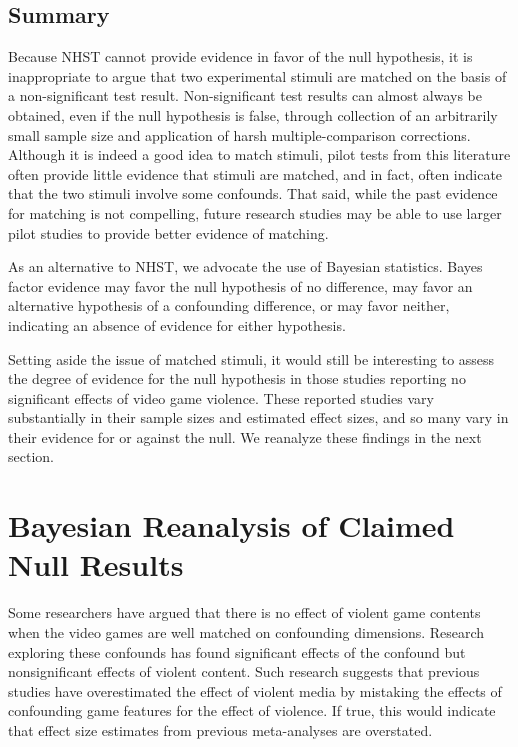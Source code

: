 \documentclass[man]{apa6}
\begin{document}
\subsection{Summary}
Because NHST cannot provide evidence in favor of the null hypothesis, it is inappropriate to argue that two experimental stimuli are matched on the basis of a non-significant test result.  Non-significant test results can almost always be obtained, even if the null hypothesis is false, through collection of an arbitrarily small sample size and application of harsh multiple-comparison corrections.  Although it is indeed a good idea to match stimuli, pilot tests from this literature often provide little evidence that stimuli are matched, and in fact, often indicate that the two stimuli involve some confounds. That said, while the past evidence for matching is not compelling, future research studies may be able to use larger pilot studies to provide better evidence of matching. 
 
As an alternative to NHST, we advocate the use of Bayesian statistics. Bayes factor evidence may favor the null hypothesis of no difference, may favor an alternative hypothesis of a confounding difference, or may favor neither, indicating an absence of evidence for either hypothesis. 

Setting aside the issue of matched stimuli, it would still be interesting to assess the degree of evidence for the null hypothesis in those studies reporting no significant effects of video game violence. These reported studies vary substantially in their sample sizes and estimated effect sizes, and so many vary in their evidence for or against the null. We reanalyze these findings in the next section.

\section{Bayesian Reanalysis of Claimed Null Results}
Some researchers have argued that there is no effect of violent game contents when the video games are well matched on confounding dimensions. Research exploring these confounds has found significant effects of the confound but nonsignificant effects of violent content. Such research suggests that previous studies have overestimated the effect of violent media by mistaking the effects of confounding game features for the effect of violence. If true, this would indicate that effect size estimates from previous meta-analyses \citep[e.g., $r = .21$ or $d = 0.43$,][]{Anderson:etal:2010} are overstated.  
\end{document}
